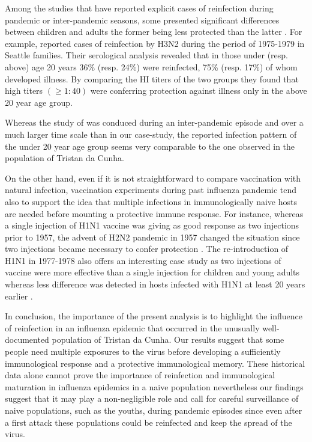 Among the studies that have reported explicit cases of reinfection
during pandemic or inter-pandemic seasons, some presented significant
differences between children and adults the former being less
protected than the latter \citep{McVernon2007}. For example,
\citet{FOX1982a,FOX1982b} reported cases of reinfection by H3N2 during
the period of 1975-1979 in Seattle families. Their serological
analysis revealed that in those under (resp. above) age 20 years 36\%
(resp. 24\%) were reinfected, 75\% (resp. 17\%) of whom developed
illness. By comparing the HI titers of the two groups they found that
high titers $(\geqslant 1:40)$ were conferring protection against
illness only in the above 20 year age group.

Whereas the study of \citeauthor{FOX1982a} was conduced during an
inter-pandemic episode and over a much larger time scale than in our
case-study, the reported infection pattern of the under 20 year age
group seems very comparable to the one observed in the population of
Tristan da Cunha.



On the other hand, even if it is not straightforward to compare
vaccination with natural infection, vaccination experiments during
past influenza pandemic tend also to support the idea that multiple
infections in immunologically naive hosts are needed before mounting a
protective immune response. For instance, whereas a single injection
of H1N1 vaccine was giving as good response as two injections prior to
1957, the advent of H2N2 pandemic in 1957 changed the situation since
two injections became necessary to confer protection
\citep{HOLLAND1958}.  The re-introduction of H1N1 in 1977-1978 also
offers an interesting case study as two injections of vaccine were
more effective than a single injection for children and young adults
whereas less difference was detected in hosts infected with H1N1 at
least 20 years earlier \citep{Nicholson1979}.


In conclusion, the importance of the present analysis is to highlight
the influence of reinfection in an influenza epidemic that occurred in
the unusually well-documented population of Tristan da Cunha. Our
results suggest that some people need multiple exposures to the virus
before developing a sufficiently immunological response and a
protective immunological memory. These historical data alone cannot
prove the importance of reinfection and immunological maturation in
influenza epidemics in a naive population nevertheless our findings
suggest that it may play a non-negligible role and call for careful
surveillance of naive populations, such as the youths, during pandemic
episodes since even after a first attack these populations could be
reinfected and keep the spread of the virus.


